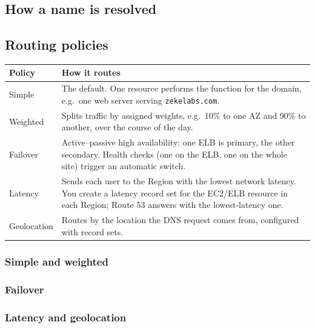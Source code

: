 \documentclass[11pt,a4paper]{article}
\begin{document}
\subsection{How a name is resolved}

\subsection{Routing policies}

\begin{tabularx}{\textwidth}{@{}lX@{}}
\toprule
\rowcolor{tablehead}\textbf{Policy} & \textbf{How it routes} \\
\midrule
Simple & The default. One resource performs the function for the domain, e.g.\ one web
  server serving \texttt{zekelabs.com}. \\
\addlinespace
Weighted & Splits traffic by assigned weights, e.g.\ 10\% to one AZ and 90\% to another,
  over the course of the day. \\
\addlinespace
Failover & Active--passive high availability: one ELB is primary, the other secondary.
  Health checks (one on the ELB, one on the whole site) trigger an automatic switch. \\
\addlinespace
Latency & Sends each user to the Region with the lowest network latency. You create a latency
  record set for the EC2/ELB resource in each Region; Route 53 answers with the
  lowest-latency one. \\
\addlinespace
Geolocation & Routes by the location the DNS request comes from, configured with record
  sets. \\
\bottomrule
\end{tabularx}

\subsubsection{Simple and weighted}

\subsubsection{Failover}

\subsubsection{Latency and geolocation}
\end{document}
